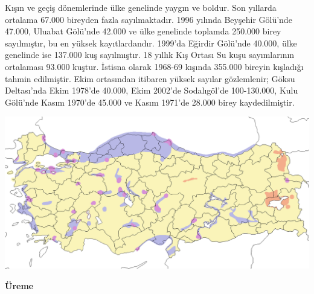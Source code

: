 \documentclass[
  a4paper,
  DIV=11,
  numbers=noendperiod]{scrartcl}
\begin{document}
Kışın ve geçiş dönemlerinde ülke genelinde yaygın ve boldur. Son
yıllarda ortalama 67.000 bireyden fazla sayılmaktadır. 1996 yılında
Beyşehir Gölü'nde 47.000, Uluabat Gölü'nde 42.000 ve ülke genelinde
toplamda 250.000 birey sayılmıştır, bu en yüksek kayıtlardandır. 1999'da
Eğirdir Gölü'nde 40.000, ülke genelinde ise 137.000 kuş sayılmıştır. 18
yıllık Kış Ortası Su kuşu sayımlarının ortalaması 93.000 kuştur. İstisna
olarak 1968-69 kışında 355.000 bireyin kışladığı tahmin edilmiştir. Ekim
ortasından itibaren yüksek sayılar gözlemlenir; Göksu Deltası'nda Ekim
1978'de 40.000, Ekim 2002'de Sodalıgöl'de 100-130.000, Kulu Gölü'nde
Kasım 1970'de 45.000 ve Kasım 1971'de 28.000 birey kaydedilmiştir.

\includegraphics{images/harita_Aythya ferina.png}

\textbf{Üreme}
\end{document}
